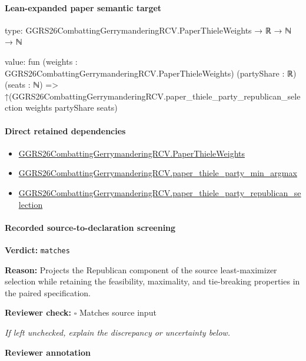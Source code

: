 \documentclass[10pt]{article}
\newcommand{\reviewerbox}{%
  \par\noindent\fbox{\parbox{0.96\linewidth}{\rule{0pt}{0.38in}}}\par
}
\newcommand{\reviewmatch}[1]{%
  \par\noindent\textbf{Reviewer check:} $\square$\; #1\par
  \noindent\emph{If left unchecked, explain the discrepancy or uncertainty below.}\par
}
\begin{document}
\paragraph{Lean-expanded paper semantic target}
\begin{ReviewVerbatim}
type:
GGRS26CombattingGerrymanderingRCV.PaperThieleWeights → ℝ → ℕ → ℕ

value:
fun (weights : GGRS26CombattingGerrymanderingRCV.PaperThieleWeights) (partyShare : ℝ) (seats : ℕ) =>
  ↑(GGRS26CombattingGerrymanderingRCV.paper_thiele_party_republican_selection weights partyShare seats)
\end{ReviewVerbatim}

\paragraph{Direct retained dependencies}
\begin{itemize}\raggedright
\item \hyperlink{paper-prerequisite-37b91baa3b4ddc9d}{GGRS26\allowbreak{}Combatting\allowbreak{}Gerrymandering\allowbreak{}RCV.\allowbreak{}Paper\allowbreak{}Thiele\allowbreak{}Weights}
\item \hyperlink{paper-prerequisite-58801459d14912d4}{GGRS26\allowbreak{}Combatting\allowbreak{}Gerrymandering\allowbreak{}RCV.\allowbreak{}paper\_\allowbreak{}thiele\_\allowbreak{}party\_\allowbreak{}min\_\allowbreak{}argmax}
\item \hyperlink{paper-prerequisite-edccbf02c4bd6a6e}{GGRS26\allowbreak{}Combatting\allowbreak{}Gerrymandering\allowbreak{}RCV.\allowbreak{}paper\_\allowbreak{}thiele\_\allowbreak{}party\_\allowbreak{}republican\_\allowbreak{}selection}
\end{itemize}
\paragraph{Recorded source-to-declaration screening}
\textbf{Verdict:} \texttt{matches}
\\
{\raggedright
\textbf{Reason:} Projects the Republican component of the source least-\allowbreak{}maximizer selection while retaining the feasibility, maximality, and tie-\allowbreak{}breaking properties in the paired specification.\allowbreak{}
\par}
\reviewmatch{Matches source input}
\noindent\textbf{Reviewer annotation}\par
\reviewerbox
\clearpage
\hypertarget{paper-prerequisite-c0f468d3ce4de7e0}{}
\end{document}
